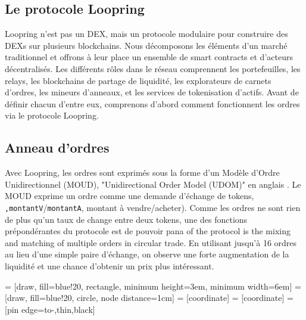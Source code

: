 \documentclass[UTF8,nofonts]{article}
\makeatletter
\newenvironment{figurehere}
 {\def\@captype{figure}}
 {}
\makeatother
\begin{document}
\begin{multicols}{2}
\section{Le protocole Loopring \label{sec:loopring_protocol}}
Loopring n'est pas un DEX, mais un protocole modulaire pour construire des DEXs sur plusieurs blockchains. Nous décomposons les éléments d'un marché traditionnel et offrons à leur place un ensemble de smart contracts et d'acteurs décentralisés. Les différents rôles dans le réseau comprennent les portefeuilles, les relays, les blockchains de partage de liquidité, les explorateurs de carnets d'ordres, les mineurs d'anneaux, et les services de tokenisation d'actifs. Avant de définir chacun d'entre eux, comprenons d'abord comment fonctionnent les ordres via le protocole Loopring.

\subsection{Anneau d'ordres\label{sec:order_ring}}
Avec Loopring, les ordres sont exprimés sous la forme d'un Modèle d'Ordre Unidirectionnel (MOUD), "Unidirectional Order Model (UDOM)" en anglais \cite{coinport2014udom}. Le MOUD exprime un ordre comme une demande d'échange de tokens, \verb|,montantV|/\verb|montantA|, montant à vendre/acheter). Comme les ordres ne sont rien de plus qu'un taux de change entre deux tokens, une des fonctions prépondérantes du protocole est de pouvoir pana of the protocol is the mixing and matching of multiple orders in circular trade. En utilisant jusqu'à 16 ordres au lieu d'une simple paire d'échange, on observe une forte augmentation de la liquidité et une chance d'obtenir un prix plus intéressant. 

\begin{center}
\begin{figurehere}
\centering
{} = [draw, fill=blue!20, rectangle, 
    minimum height=3em, minimum width=6em]
 = [draw, fill=blue!20, circle, node distance=1cm]
 = [coordinate]
 = [coordinate]
 = [pin edge={to-,thin,black}]

\begin{tikzpicture}[
    auto, 
    node distance=2cm,
    >=latex',
    font=\bfseries\footnotesize\sffamily,
    order/.style={
		scale=0.7,
		rectangle,
		rounded corners,
		draw=black, 
		text centered,
		minimum height=12mm,
		fill=white
	},
	label/.style={
		scale=0.7
	}
  ]


\end{tikzpicture}
\end{figurehere}
\end{center}
\end{multicols}
\end{document}
